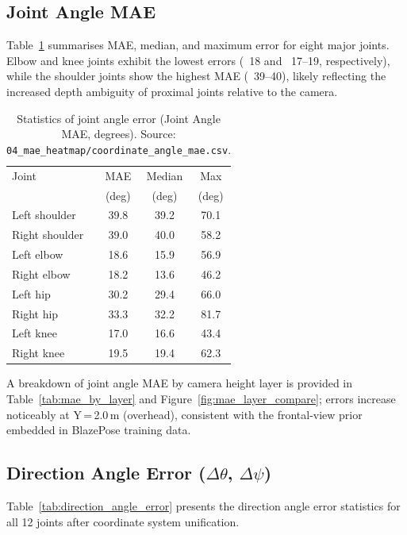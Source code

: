 \documentclass[twocolumn]{article}
\begin{document}
\subsection{Joint Angle MAE}

Table~\ref{tab:joint_angle_error} summarises MAE, median, and maximum
error for eight major joints. Elbow and knee joints exhibit the lowest
errors (~18\degree{} and ~17--19\degree{}, respectively), while the shoulder joints show
the highest MAE (~39--40\degree{}), likely reflecting the increased depth ambiguity
of proximal joints relative to the camera.

\begin{table}[!t]
\centering
\caption{Statistics of joint angle error (Joint Angle MAE, degrees).
  Source: \texttt{04\_mae\_heatmap/coordinate\_angle\_mae.csv}.}
\label{tab:joint_angle_error}
\begin{tabular}{lccc}
\toprule
Joint          & MAE    & Median & Max    \\
               & (deg)  & (deg)  & (deg)  \\
\midrule
Left shoulder  & 39.8   & 39.2   & 70.1   \\
Right shoulder & 39.0   & 40.0   & 58.2   \\
Left elbow     & 18.6   & 15.9   & 56.9   \\
Right elbow    & 18.2   & 13.6   & 46.2   \\
Left hip       & 30.2   & 29.4   & 66.0   \\
Right hip      & 33.3   & 32.2   & 81.7   \\
Left knee      & 17.0   & 16.6   & 43.4   \\
Right knee     & 19.5   & 19.4   & 62.3   \\
\bottomrule
\end{tabular}
\end{table}

A breakdown of joint angle MAE by camera height layer is provided in
Table~\ref{tab:mae_by_layer} and Figure~\ref{fig:mae_layer_compare};
errors increase noticeably at Y\,=\,2.0\,m (overhead), consistent with
the frontal-view prior embedded in BlazePose training data.

\subsection{Direction Angle Error ($\Delta\theta$, $\Delta\psi$)}

Table~\ref{tab:direction_angle_error} presents the direction angle error
statistics for all 12 joints after coordinate system unification.
\end{document}

